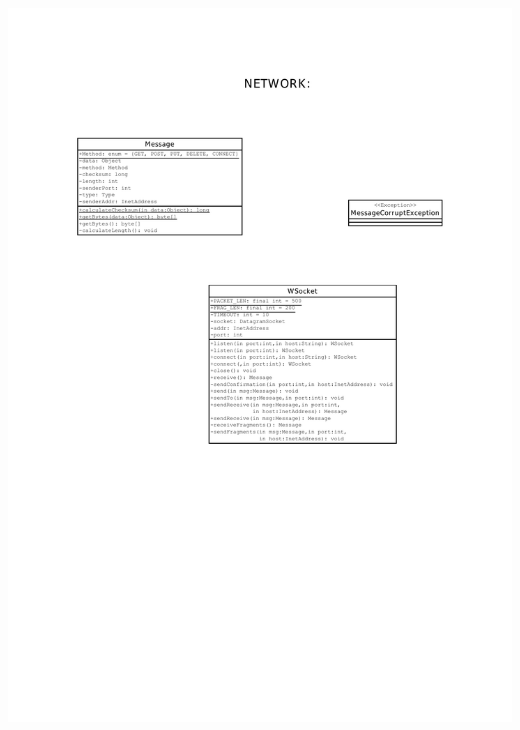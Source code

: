 \documentclass[11pt,english]{article}
\begin{document}
\includegraphics[width=6.2in]{figures/uml2.pdf} \\ 
\end{document}
